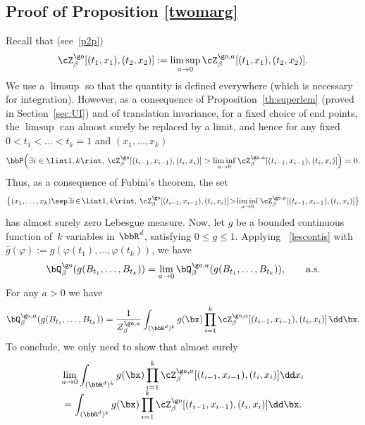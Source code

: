 \subsection{Proof of Proposition \ref{twomarg}}
\label{sec:twomarg}

Recall that (see~\eqref{p2p})\vspace*{-3pt}
\[
\cZ^{\go}_{\beta}[(t_1,x_1),(t_2,x_2)]:= \limsup_{a\to 0}\cZ^{\go,a}_{\beta}[(t_1,x_1),(t_2,x_2)].
\]
We use a $\limsup$ so that the quantity is defined everywhere (which is necessary for integration).
However, as a consequence of Proposition~\ref{th:superlem} (proved in Section~\ref{sec:UI}) and of translation invariance,
for a fixed choice of end points, the $\limsup$ can almost surely be replaced by a limit, and hence
for any fixed $0<t_1<\dots<t_k=1$ and
$(x_1, \ldots, x_k)$\vspace*{-3pt}%
\[
\bbP\Bigl(\exists i\in \lint 1,k\rint,\, \cZ^{\go}_{\beta}[(t_{i-1},x_{i-1}),(t_i,x_{i})]
> \liminf_{a\to 0} \cZ^{\go,a}_{\beta}[(t_{i-1},x_{i-1}),(t_i,x_{i})] \Bigr)=0.
\]
Thus, as a consequence of Fubini's theorem, the set\vspace*{-3pt}
\[
\bigl\{ (x_1, \ldots, x_k) \sep \exists i\!\in\!\lint 1,k\rint,\,
\cZ^{\go}_{\beta}[(t_{i-1},x_{i-1}),(t_i,x_{i})]\!>\!\liminf_{a\to 0} \cZ^{\go,a}_{\beta}[(t_{i-1},x_{i-1}),(t_i,x_{i})] \bigr\}
\]
has almost surely zero Lebesgue measure.
Now, let $g$ be a bounded continuous function of~$k$ variables in $\bbR^d$, satisfying $0\le g \le 1$.
Applying~ \eqref{lescontis} with $\bar g(\varphi):= g(\varphi(t_1),\dots,\varphi(t_k))$, we have
\begin{equation}
\bQ^{\go}_{\beta}(g(B_{t_1},\dots, B_{t_k}))=\lim_{a\to 0} \bQ^{\go,a}_{\beta}(g(B_{t_1},\dots, B_{t_k})), \qquad \text{a.s.}
\end{equation}
For any $a>0$ we have
\begin{equation}
\bQ^{\go,a}_{\beta}(g(B_{t_1},\dots, B_{t_k}))= \frac{1}{\mathcal Z^{\go,a}_{\beta}} \int_{(\bbR^d)^k} g(\bx)\prod_{i=1}^k \cZ^{\go,a}_{\beta}[(t_{i-1},x_{i-1}),(t_i,x_{i})] \,\dd \bx.
\end{equation}
To conclude, we only need to show that almost surely\vspace*{-5pt}
\begin{multline}\label{afaire}
\lim_{a\to 0} \int_{(\bbR^d)^k} g(\bx)\prod_{i=1}^k \cZ^{\go,a}_{\beta}[(t_{i-1},x_{i-1}),(t_i,x_{i})] \dd x_i \\[-5pt]
= \int_{(\bbR^d)^k} g(\bx)\prod_{i=1}^k \cZ^{\go}_{\beta}[(t_{i-1},x_{i-1}),(t_i,x_{i})] \dd \bx.
\end{multline}
